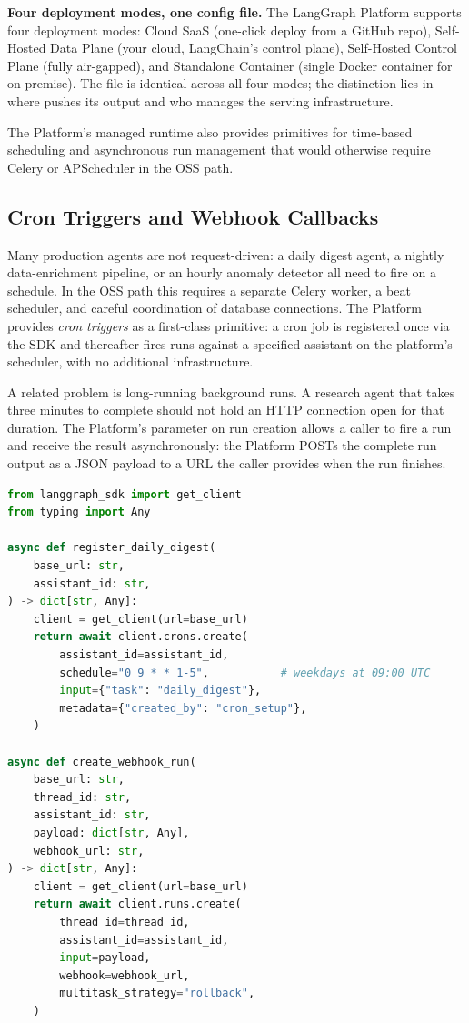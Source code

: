 \begin{notebox}
  \textbf{Four deployment modes, one config file.}\quad
  The LangGraph Platform supports four deployment modes: Cloud SaaS
  (one-click deploy from a GitHub repo), Self-Hosted Data Plane (your cloud,
  LangChain's control plane), Self-Hosted Control Plane (fully air-gapped),
  and Standalone Container (single Docker container for on-premise). The
   file is identical across all four modes; the
  distinction lies in where  pushes its output and who
  manages the serving infrastructure.
\end{notebox}

The Platform's managed runtime also provides primitives for time-based
scheduling and asynchronous run management that would otherwise require
Celery or APScheduler in the OSS path.

\subsection*{Cron Triggers and Webhook Callbacks}

Many production agents are not request-driven: a daily digest agent, a
nightly data-enrichment pipeline, or an hourly anomaly detector all need
to fire on a schedule. In the OSS path this requires a separate Celery worker,
a beat scheduler, and careful coordination of database connections. The
Platform provides \emph{cron triggers} as a first-class primitive: a cron job
is registered once via the SDK and thereafter fires runs against a specified
assistant on the platform's scheduler, with no additional infrastructure.

A related problem is long-running background runs. A research agent that
takes three minutes to complete should not hold an HTTP connection open for
that duration. The Platform's  parameter on run creation allows
a caller to fire a run and receive the result asynchronously: the Platform
POSTs the complete run output as a JSON payload to a URL the caller provides
when the run finishes.

\begin{lstlisting}[language=Python,
  caption={Platform cron registration and webhook run creation ---
    \texttt{src/platform/cron\_setup.py}},
  label={lst:cron-setup}]
from langgraph_sdk import get_client
from typing import Any

async def register_daily_digest(
    base_url: str,
    assistant_id: str,
) -> dict[str, Any]:
    client = get_client(url=base_url)
    return await client.crons.create(
        assistant_id=assistant_id,
        schedule="0 9 * * 1-5",           # weekdays at 09:00 UTC
        input={"task": "daily_digest"},
        metadata={"created_by": "cron_setup"},
    )

async def create_webhook_run(
    base_url: str,
    thread_id: str,
    assistant_id: str,
    payload: dict[str, Any],
    webhook_url: str,
) -> dict[str, Any]:
    client = get_client(url=base_url)
    return await client.runs.create(
        thread_id=thread_id,
        assistant_id=assistant_id,
        input=payload,
        webhook=webhook_url,
        multitask_strategy="rollback",
    )
\end{lstlisting}

